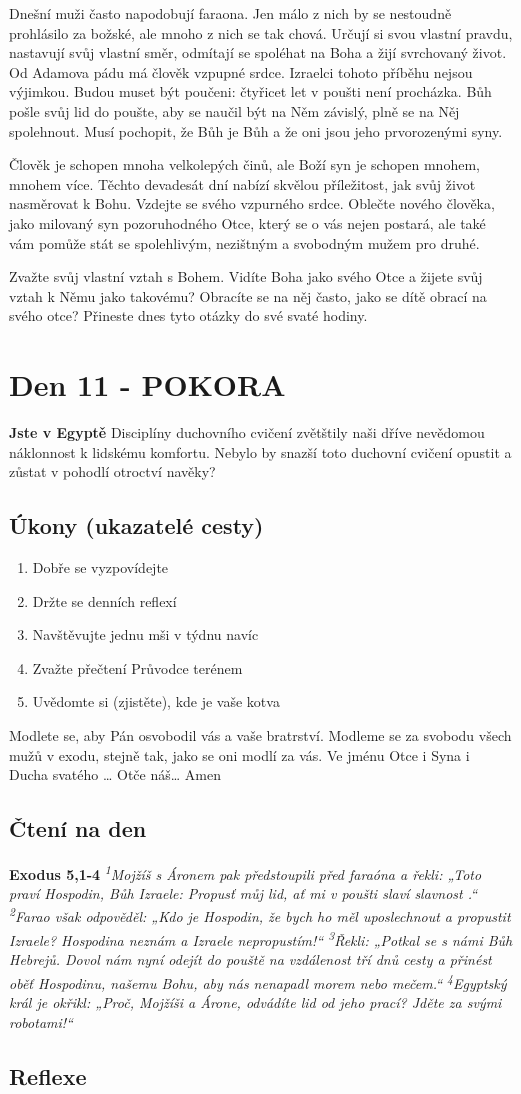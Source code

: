 \documentclass[11pt]{article}
\newcommand{\zacatekDruhyTyden}{
  \textbf{Jste v Egyptě} \newline
  Disciplíny duchovního cvičení zvětštily naši dříve nevědomou náklonnost k lidskému komfortu.
  Nebylo by snazší toto duchovní cvičení opustit a zůstat v pohodlí otroctví navěky?

  \subsection*{Úkony (ukazatelé cesty)}
\begin{enumerate}
  \item Dobře se vyzpovídejte
  \item Držte se denních reflexí
  \item Navštěvujte jednu mši v týdnu navíc
  \item Zvažte přečtení Průvodce terénem
  \item Uvědomte si (zjistěte), kde je vaše kotva
\end{enumerate}
Modlete se, aby Pán osvobodil vás a vaše bratrství. \newline
Modleme se za svobodu všech mužů v exodu, stejně tak, jako se oni modlí za vás.\newline
Ve jménu Otce i Syna i Ducha svatého …  Otče náš… Amen
}
\begin{document}
Dnešní muži často napodobují faraona. Jen málo z nich by se nestoudně prohlásilo za božské, ale mnoho z nich se
tak chová. Určují si svou vlastní pravdu, nastavují svůj vlastní směr, odmítají se spoléhat na Boha a žijí svrchovaný
život. Od Adamova pádu má člověk vzpupné srdce. Izraelci tohoto příběhu nejsou výjimkou. Budou muset být
poučeni: čtyřicet let v poušti není procházka. Bůh pošle svůj lid do poušte, aby se naučil být na Něm závislý, plně se
na Něj spolehnout. Musí pochopit, že Bůh je Bůh a že oni jsou jeho prvorozenými syny.

Člověk je schopen mnoha velkolepých činů, ale Boží syn je schopen mnohem, mnohem více. Těchto devadesát dní
nabízí skvělou příležitost, jak svůj život nasměrovat k Bohu. Vzdejte se svého vzpurného srdce. Oblečte nového
člověka, jako milovaný syn pozoruhodného Otce, který se o vás nejen postará, ale také vám pomůže stát se
spolehlivým, nezištným a svobodným mužem pro druhé.

Zvažte svůj vlastní vztah s Bohem. Vidíte Boha jako svého Otce a žijete svůj vztah k Němu jako takovému?
Obracíte se na něj často, jako se dítě obrací na svého otce? Přineste dnes tyto otázky do své svaté hodiny.

\newpage
\section{Den 11 - POKORA}
\zacatekDruhyTyden
\subsection*{Čtení na den}
\textbf{Exodus 5,1-4}
\newline
\textit{
\textsuperscript{1}Mojžíš s Áronem pak předstoupili před faraóna a řekli: „Toto praví Hospodin, Bůh Izraele: Propusť můj lid, ať mi v poušti slaví slavnost .“
\textsuperscript{2}Farao však odpověděl: „Kdo je Hospodin, že bych ho měl uposlechnout a propustit Izraele? Hospodina neznám a Izraele nepropustím!“
\textsuperscript{3}Řekli: „Potkal se s námi Bůh Hebrejů. Dovol nám nyní odejít do pouště na vzdálenost tří dnů cesty a přinést oběť Hospodinu, našemu Bohu, aby nás nenapadl morem nebo mečem.“
\textsuperscript{4}Egyptský král je okřikl: „Proč, Mojžíši a Árone, odvádíte lid od jeho prací? Jděte za svými robotami!“
}

\newpage
\subsection*{Reflexe}
\end{document}
